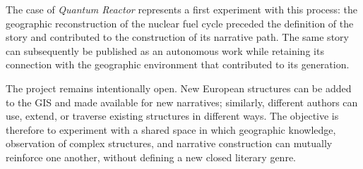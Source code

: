 \documentclass[11pt,a4paper]{article}
\begin{document}
The case of \emph{Quantum Reactor} represents a first experiment with this process: the geographic reconstruction of the nuclear fuel cycle preceded the definition of the story and contributed to the construction of its narrative path. The same story can subsequently be published as an autonomous work while retaining its connection with the geographic environment that contributed to its generation.

The project remains intentionally open. New European structures can be added to the GIS and made available for new narratives; similarly, different authors can use, extend, or traverse existing structures in different ways. The objective is therefore to experiment with a shared space in which geographic knowledge, observation of complex structures, and narrative construction can mutually reinforce one another, without defining a new closed literary genre.
\end{document}
